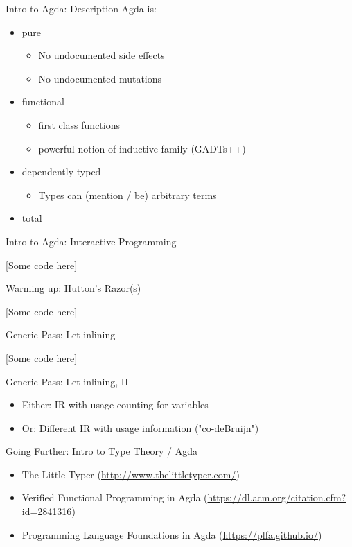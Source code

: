 \documentclass{beamer}
\newcommand{\codehere}{
\begin{center}
{\large[Some code here]}
\end{center}
}
\begin{document}
\begin{frame}{Intro to Agda: Description}
Agda is:
\begin{itemize}
  \item pure
    \begin{itemize}
      \item No undocumented side effects
      \item No undocumented mutations
    \end{itemize}
  \item functional
    \begin{itemize}
      \item first class functions
      \item powerful notion of inductive family (GADTs++)
    \end{itemize}
  \item dependently typed
    \begin{itemize}
      \item Types can (mention / be) arbitrary terms
    \end{itemize}
  \item<1> total
\end{itemize}

\end{frame}

\begin{frame}{Intro to Agda: Interactive Programming}
\codehere
\end{frame}

\begin{frame}{Warming up: Hutton's Razor(s)}
\codehere
\end{frame}

\begin{frame}{Generic Pass: Let-inlining}
\codehere
\end{frame}

\begin{frame}{Generic Pass: Let-inlining, II}
\begin{itemize}
  \item Either: IR with usage counting for variables
  \item Or: Different IR with usage information ("co-deBruijn")
\end{itemize}
\end{frame}

\begin{frame}{Going Further: Intro to Type Theory / Agda}

\begin{itemize}
  \item The Little Typer (\url{http://www.thelittletyper.com/})
  \item Verified Functional Programming in Agda (\url{https://dl.acm.org/citation.cfm?id=2841316})
  \item Programming Language Foundations in Agda (\url{https://plfa.github.io/})
\end{itemize}
\end{frame}
\end{document}
